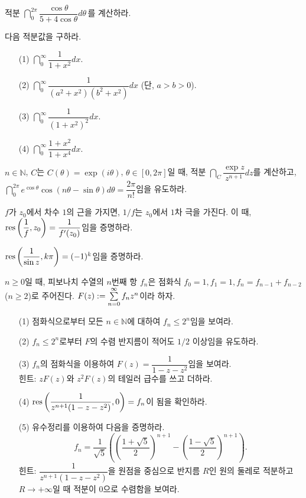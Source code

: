 \begin{salt_exercise}\label{ex-4-41}
적분 $\dint_0^{2\pi} \dfrac{\cos \theta}{5 + 4\cos\theta}d\theta$\,를 계산하라.
\end{salt_exercise}

\begin{salt_exercise}\label{ex-4-42}
다음 적분값을 구하라.
\begin{itemize}
\item[(1)] $\dint_0^\infty \dfrac1{1+x^2} dx$.
\item[(2)] $\dint_0^\infty \dfrac1{(a^2+x^2)(b^2+x^2)}dx$ (단, $a>b>0$).
\item[(3)] $\dint_0^\infty \dfrac1{(1+x^2)^2}dx$.
\item[(4)] $\dint_0^\infty \dfrac{1+x^2}{1+x^4}dx$.
\end{itemize}
\end{salt_exercise}

\begin{salt_exercise}\label{ex-4-43}
$n\in\mathbb N$, $C$는 $C(\theta)=\exp(i\theta)$, $\theta \in [0,2\pi]$일 때,
적분 $\dint_C \dfrac{\exp z}{z^{n+1}}dz$를 계산하고,
$\dint_0^{2\pi} e^{\cos\theta}\cos(n\theta - \sin \theta)d\theta = \dfrac{2\pi}{n!}$임을
유도하라.
\end{salt_exercise}

\begin{salt_exercise}\label{ex-4-44}
$f$가 $z_0$에서 차수 $1$의 근을 가지면, $1/f$는 $z_0$에서 $1$차 극을 가진다.
이 때,
$\mathop{\mathrm{res}}\left(\displaystyle\frac1f, z_0\right) = \displaystyle\frac1{f'(z_0)}$임을 증명하라.
\end{salt_exercise}

\begin{salt_exercise}\label{ex-4-45}
$\mathop{\mathrm{res}}\left(\displaystyle\frac1{\sin z}, k\pi\right) = (-1)^k$임을 증명하라.
\end{salt_exercise}

\begin{salt_exercise}\label{ex-4-46}
$n\ge0$일 때, 피보나치 수열의 $n$번째 항 $f_n$은 
점화식 $f_0=1, f_1=1, f_n = f_{n-1} + f_{n-2}$ ($n\ge2$)로 주어진다.
$F(z):= \sum\limits_{n=0}^\infty f_nz^n$이라 하자.
\begin{itemize}
\item[(1)] 점화식으로부터 모든 $n\in\mathbb N$에 대하여 $f_n\le 2^n$임을 보여라.
\item[(2)] $f_n\le 2^n$로부터 $F$의 수렴 반지름이 적어도 $1/2$ 이상임을 유도하라.
\item[(3)] $f_n$의 점화식을 이용하여 $F(z) = \dfrac1{1-z-z^2}$임을 보여라. \\
힌트: $zF(z)$와 $z^2F(z)$의 테일러 급수를 쓰고 더하라.
\item[(4)] $\mathop{\mathrm{res}} \left( \displaystyle\frac1{z^{n+1}(1-z-z^2)}, 0\right)=f_n$이 됨을 확인하라.
\item[(5)] 유수정리를 이용하여 다음을 증명하라.
\[
f_n = \dfrac1{\sqrt{5}} \left( \left(\dfrac{1+\sqrt{5}}2\right)^{n+1}
- \left(\dfrac{1-\sqrt{5}}2\right)^{n+1} \right).
\]
힌트: $\dfrac1{z^{n+1}(1-z-z^2)}$을 원점을 중심으로 반지름  $R$인 원의 둘레로
적분하고 $R\to+\infty$일 때 적분이 $0$으로 수렴함을 보여라.
\end{itemize}
\end{salt_exercise}

